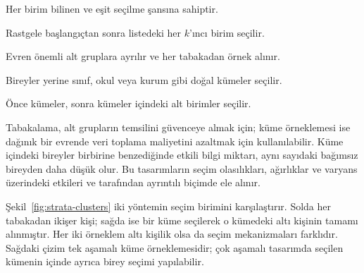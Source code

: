 \begin{description}[style=nextline,leftmargin=3.7cm,labelwidth=3.4cm]
  \item[Basit rastgele örnekleme] Her birim bilinen ve eşit seçilme şansına sahiptir.
  \item[Sistematik örnekleme] Rastgele başlangıçtan sonra listedeki her $k$'ıncı birim seçilir.
  \item[Tabakalı örnekleme] Evren önemli alt gruplara ayrılır ve her tabakadan örnek alınır.
  \item[Küme örneklemesi] Bireyler yerine sınıf, okul veya kurum gibi doğal kümeler seçilir.
  \item[Çok aşamalı örnekleme] Önce kümeler, sonra kümeler içindeki alt birimler seçilir.
\end{description}

Tabakalama, alt grupların temsilini güvenceye almak için; küme örneklemesi ise
dağınık bir evrende veri toplama maliyetini azaltmak için kullanılabilir.
Küme içindeki bireyler birbirine benzediğinde etkili bilgi miktarı, aynı
sayıdaki bağımsız bireyden daha düşük olur. Bu tasarımların seçim olasılıkları,
ağırlıklar ve varyans üzerindeki etkileri \citet{cochran1977} ve
\citet{lohr2021} tarafından ayrıntılı biçimde ele alınır.

Şekil~\ref{fig:strata-clusters} iki yöntemin seçim birimini karşılaştırır.
Solda her tabakadan ikişer kişi; sağda ise bir küme seçilerek o kümedeki
altı kişinin tamamı alınmıştır. Her iki örneklem altı kişilik olsa da
seçim mekanizmaları farklıdır. Sağdaki çizim tek aşamalı küme örneklemesidir;
çok aşamalı tasarımda seçilen kümenin içinde ayrıca birey seçimi yapılabilir.


